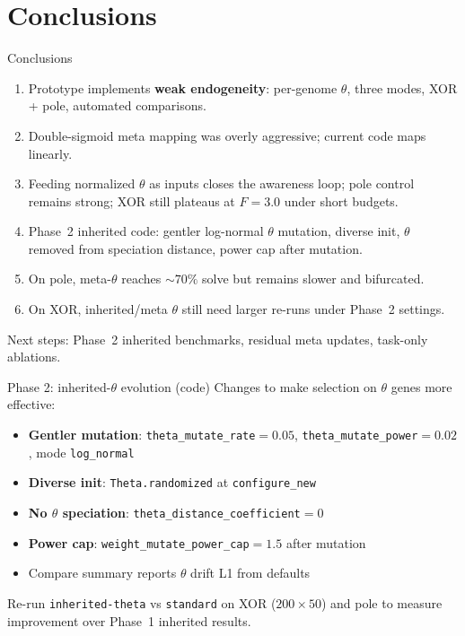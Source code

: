 \documentclass[aspectratio=169,11pt]{beamer}
\begin{document}
\section{Conclusions}

\begin{frame}{Conclusions}
  \begin{enumerate}
    \item Prototype implements \textbf{weak endogeneity}: per-genome $\theta$, three modes,
      XOR + pole, automated comparisons.
    \item Double-sigmoid meta mapping was overly aggressive; current code maps linearly.
    \item Feeding normalized $\theta$ as inputs closes the awareness loop; pole control
      remains strong; XOR still plateaus at $F=3.0$ under short budgets.
    \item Phase~2 inherited code: gentler log-normal $\theta$ mutation, diverse init,
      $\theta$ removed from speciation distance, power cap after mutation.
    \item On pole, meta-$\theta$ reaches $\sim 70\%$ solve but remains slower and bifurcated.
    \item On XOR, inherited/meta $\theta$ still need larger re-runs under Phase~2 settings.
  \end{enumerate}

  \vspace{0.5em}
  Next steps: Phase~2 inherited benchmarks, residual meta updates, task-only ablations.
\end{frame}

\begin{frame}{Phase 2: inherited-$\theta$ evolution (code)}
  Changes to make selection on $\theta$ genes more effective:

  \vspace{0.5em}
  \begin{itemize}
    \item \textbf{Gentler mutation}: \texttt{theta\_mutate\_rate}${}=0.05$,
      \texttt{theta\_mutate\_power}${}=0.02$, mode \texttt{log\_normal}
    \item \textbf{Diverse init}: \texttt{Theta.randomized} at \texttt{configure\_new}
    \item \textbf{No $\theta$ speciation}: \texttt{theta\_distance\_coefficient}${}=0$
    \item \textbf{Power cap}: \texttt{weight\_mutate\_power\_cap}${}=1.5$ after mutation
    \item Compare summary reports $\theta$ drift L1 from defaults
  \end{itemize}

  \vspace{0.6em}
  Re-run \texttt{inherited-theta} vs \texttt{standard} on XOR ($200\times 50$) and pole
  to measure improvement over Phase~1 inherited results.
\end{frame}
\end{document}
